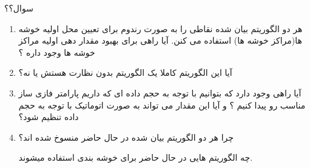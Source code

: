 \documentclass[10pt]{beamer}
\begin{document}
\begin{frame}{سوال؟؟}

\begin{enumerate}
	\item 
هر دو الگوریتم بیان شده نقاطی را به صورت رندوم برای تعیین محل اولیه خوشه ها(مراکز خوشه ها) استفاده می کنن. آیا راهی برای بهبود مقدار دهی اولیه مراکز خوشه ها وجود داره ؟
	\item 
آیا این الگوریتم کاملا یک الگوریتم بدون نظارت هستش یا نه؟
	\item
آیا راهی وجود دارد که بتوانیم با توجه به حجم داده ای که داریم پارامتر فازی ساز  مناسب رو پیدا کنیم ؟ و آیا این مقدار می تواند به صورت اتوماتیک با توجه به حجم داده تنظیم شود؟
	\item 
چرا هر دو الگوریتم بیان شده در حال حاضر منسوخ شده اند؟

چه الگوریتم هایی در حال حاضر برای خوشه بندی استفاده میشوند.
\end{enumerate}
\end{frame}
	
	
\end{document}
